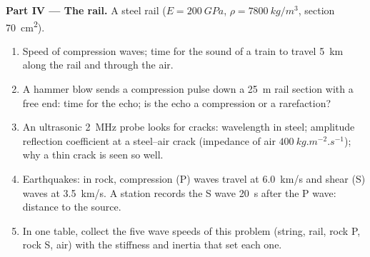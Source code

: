 \begin{problem}
\medskip
\noindent\textbf{Part IV --- The rail.}
A steel rail ($E = \qty{200}{GPa}$, $\rho = \qty{7800}{kg/m^3}$, section
\qty{70}{cm^2}).
\begin{enumerate}[resume]
  \item Speed of compression waves; time for the sound of a train to
        travel \qty{5}{km} along the rail and through the air.
  \item A hammer blow sends a compression pulse down a \qty{25}{m} rail
        section with a free end: time for the echo; is the echo a
        compression or a rarefaction?
  \item An ultrasonic \qty{2}{MHz} probe looks for cracks: wavelength in
        steel; amplitude reflection coefficient at a steel--air crack
        (impedance of air $\qty{400}{kg.m^{-2}.s^{-1}}$); why a thin
        crack is seen so well.
  \item Earthquakes: in rock, compression (P) waves travel at
        \qty{6.0}{km/s} and shear (S) waves at \qty{3.5}{km/s}. A station
        records the S wave \qty{20}{s} after the P wave: distance to the
        source.
  \item In one table, collect the five wave speeds of this problem
        (string, rail, rock P, rock S, air) with the stiffness and
        inertia that set each one.
\end{enumerate}
\end{problem}
